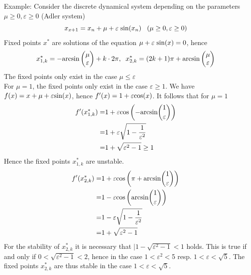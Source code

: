 Example: Consider the discrete dynamical system depending on the parameters $\mu \geq 0, \varepsilon \geq 0$ (Adler system)
\begin{equation}
  x_{x+1} = x_n + \mu + \varepsilon \; \textup{sin}(x_n) \;\;\; (\mu \geq 0, \varepsilon \geq 0)
\end{equation}
Fixed points $x^*$ are solutions of the equation $\mu + \varepsilon \; \textup{sin}(x) = 0$, hence
\begin{equation}
  x^*_{1, k} = -\textup{arcsin}\begin{pmatrix} \mu \\ \varepsilon \end{pmatrix} + k \cdot 2\pi, \;\;
  x^*_{2, k} = (2k + 1)\pi + \textup{arcsin}\begin{pmatrix} \mu \\ \varepsilon \end{pmatrix}
\end{equation}
The fixed points only exist in the case $\mu \leq \varepsilon$\\
For $\mu = 1$, the fixed points only exist in the case $\varepsilon \geq 1$. We have $f(x) = x + \mu + \varepsilon \textup{sin}(x)$, hence $f'(x) = 1 + \varepsilon \textup{cos}(x)$. It follows that for $\mu = 1$
\begin{equation}
  \begin{split}
    f'(x^*_{1, k}) =& 1 + \varepsilon \textup{cos}\left(-\textup{arcsin}\binom{1}{\varepsilon}\right)\\
    =& 1 + \varepsilon \sqrt{1 - \frac{1}{\varepsilon^2}}\\
    =& 1 + \sqrt{\varepsilon^2 - 1} \geq 1
  \end{split}
\end{equation}
Hence the fixed points $x^*_{1, k}$ are unstable.
\begin{equation}
  \begin{split}
    f'(x^*_{2, k}) =& 1 + \varepsilon \textup{cos}\left(\pi + \textup{arcsin}\binom{1}{\varepsilon}\right)\\
    =& 1 - \varepsilon \textup{cos}\left(\textup{arcsin}\binom{1}{\varepsilon}\right)\\
    =& 1 - \varepsilon \sqrt{1 - \frac{1}{\varepsilon^2}}\\
    =& 1 + \sqrt{\varepsilon^2 - 1}
  \end{split}
\end{equation}
For the stability of $x^*_{2, k}$ it is necessary that $|1 - \sqrt{\varepsilon^2-1} < 1$ holds. This is true if and only if $0 < \sqrt{\varepsilon^2 - 1} < 2$, hence in the case $1 < \varepsilon^2 < $5 resp. $1 < \varepsilon < \sqrt{5}$. The fixed points $x^*_{2, k}$ are thus stable in the case $1<\varepsilon<\sqrt{5}$.
